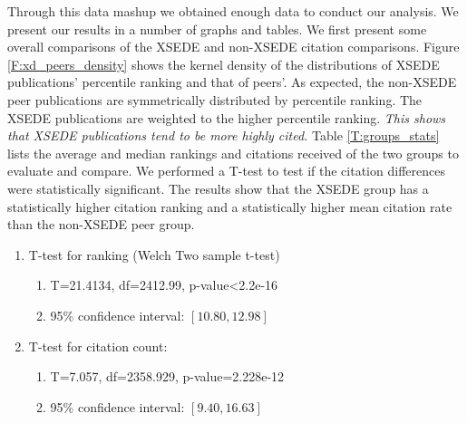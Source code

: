 \documentclass{sig-alternate}
\begin{document}
Through this data mashup we obtained enough data to conduct our analysis.
We present our results in a number of graphs and tables. We first present some overall comparisons of the XSEDE and non-XSEDE citation comparisons. Figure \ref{F:xd_peers_density} shows the kernel density of the distributions of XSEDE publications' percentile ranking and that of peers'.  As expected, the non-XSEDE peer publications are symmetrically distributed by percentile ranking.  The XSEDE publications are weighted to the higher percentile ranking. {\em This shows that XSEDE publications tend to be more highly cited.} Table \ref{T:groups_stats} lists the average and median rankings and citations received of the two groups to evaluate and compare. We performed a T-test to test if the citation differences were statistically significant. The results show that the XSEDE group has a statistically higher citation ranking and a statistically higher  mean citation rate than the non-XSEDE peer group.

\begin{enumerate}
\item T-test for ranking (Welch Two sample t-test)
\begin{enumerate}
\item T=21.4134, df=2412.99, p-value<2.2e-16
\item 95\% confidence interval: $[10.80, 12.98]$
\end{enumerate}
\item T-test for citation count:
\begin{enumerate}
\item T=7.057, df=2358.929, p-value=2.228e-12
\item 95\% confidence interval: $[9.40, 16.63]$
\end{enumerate}
\end{enumerate}
 
\end{document}
